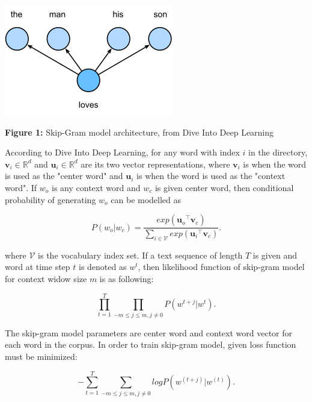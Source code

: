 \documentclass[man]{apa7}
\begin{document}
\begin{center}

\includegraphics[scale=1]{skip-gram.png}

\textbf{Figure 1:} Skip-Gram model architecture, from Dive Into Deep Learning\\[2\baselineskip]

\end{center}

According to Dive Into Deep Learning, for any word with index $\mathit{i}$ in the directory, $\mathbf{v_\mathit{i}} \in \mathbb{R}^d$ and $\mathbf{u_\mathit{i}} \in \mathbb{R}^d$ are its two vector representations, where $\mathbf{v_\mathit{i}}$ is when the word is used as the "center word" and $\mathbf{u_\mathit{i}}$ is when the word is used as the "context word". If $\mathit{w_o}$ is any context word and $\mathit{w_c}$ is given center word, then conditional probability of generating $\mathit{w_o}$ can be modelled as

\begin{equation}
P(w_o | w_c) = \frac{exp(\mathbf{u_\mathit{o}}^\top \mathbf{v_\mathit{c}})}{\sum_{i \in \mathcal{V}} exp(\mathbf{u_\mathit{i}}^\top \mathbf{v_\mathit{c}})}.
\end{equation}

where $ \mathcal{V}$ is the vocabulary index set. If a text sequence of length $T$ is given and word at time step $t$ is denoted as $\mathit{w}^t$, then likelihood function of skip-gram model for context widow size $m$ is as following:

\begin{equation}
\prod_{t=1}^T \prod_{-m \le j \le m , j \neq 0} P(w^{t+j} | w^t).
\end{equation}

The skip-gram model parameters are center word and context word vector for each word in the corpus. In order to train skip-gram model, given loss function must be minimized:

$$ -\sum_{t=1}^T \sum_{-m \le j \le m, j \neq 0} logP(w^{(t+j)} | w^{(t)}).$$
\end{document}
